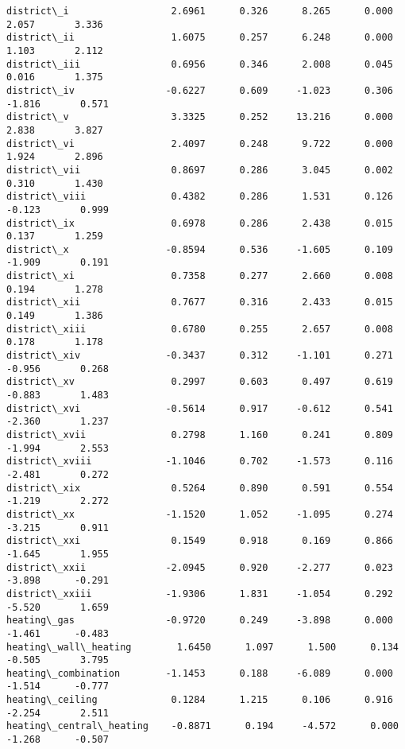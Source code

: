 \documentclass[11pt]{article}
\begin{document}
\begin{Verbatim}[commandchars=\\\{\}]
district\_i                  2.6961      0.326      8.265      0.000       2.057       3.336
district\_ii                 1.6075      0.257      6.248      0.000       1.103       2.112
district\_iii                0.6956      0.346      2.008      0.045       0.016       1.375
district\_iv                -0.6227      0.609     -1.023      0.306      -1.816       0.571
district\_v                  3.3325      0.252     13.216      0.000       2.838       3.827
district\_vi                 2.4097      0.248      9.722      0.000       1.924       2.896
district\_vii                0.8697      0.286      3.045      0.002       0.310       1.430
district\_viii               0.4382      0.286      1.531      0.126      -0.123       0.999
district\_ix                 0.6978      0.286      2.438      0.015       0.137       1.259
district\_x                 -0.8594      0.536     -1.605      0.109      -1.909       0.191
district\_xi                 0.7358      0.277      2.660      0.008       0.194       1.278
district\_xii                0.7677      0.316      2.433      0.015       0.149       1.386
district\_xiii               0.6780      0.255      2.657      0.008       0.178       1.178
district\_xiv               -0.3437      0.312     -1.101      0.271      -0.956       0.268
district\_xv                 0.2997      0.603      0.497      0.619      -0.883       1.483
district\_xvi               -0.5614      0.917     -0.612      0.541      -2.360       1.237
district\_xvii               0.2798      1.160      0.241      0.809      -1.994       2.553
district\_xviii             -1.1046      0.702     -1.573      0.116      -2.481       0.272
district\_xix                0.5264      0.890      0.591      0.554      -1.219       2.272
district\_xx                -1.1520      1.052     -1.095      0.274      -3.215       0.911
district\_xxi                0.1549      0.918      0.169      0.866      -1.645       1.955
district\_xxii              -2.0945      0.920     -2.277      0.023      -3.898      -0.291
district\_xxiii             -1.9306      1.831     -1.054      0.292      -5.520       1.659
heating\_gas                -0.9720      0.249     -3.898      0.000      -1.461      -0.483
heating\_wall\_heating        1.6450      1.097      1.500      0.134      -0.505       3.795
heating\_combination        -1.1453      0.188     -6.089      0.000      -1.514      -0.777
heating\_ceiling             0.1284      1.215      0.106      0.916      -2.254       2.511
heating\_central\_heating    -0.8871      0.194     -4.572      0.000      -1.268      -0.507

\end{Verbatim}
\end{document}
